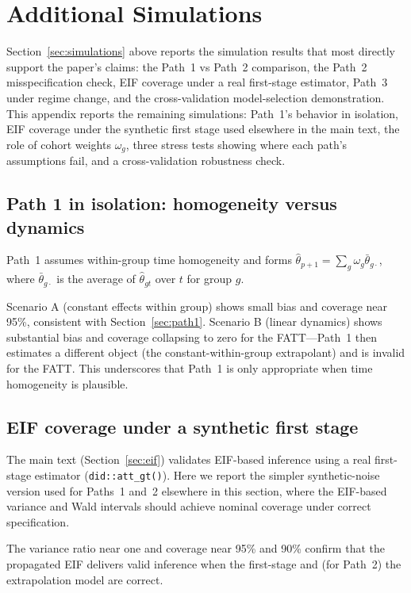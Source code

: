 \documentclass{article}
\begin{document}
\appendix

\section{Additional Simulations}\label{app:additional-sims}

Section~\ref{sec:simulations} above reports the simulation results that most directly support the paper's claims: the Path~1 vs Path~2 comparison, the Path~2 misspecification check, EIF coverage under a real first-stage estimator, Path~3 under regime change, and the cross-validation model-selection demonstration. This appendix reports the remaining simulations: Path~1's behavior in isolation, EIF coverage under the synthetic first stage used elsewhere in the main text, the role of cohort weights $\omega_g$, three stress tests showing where each path's assumptions fail, and a cross-validation robustness check.

\subsection{Path 1 in isolation: homogeneity versus dynamics}

Path~1 assumes within-group time homogeneity and forms $\widehat{\theta}_{p+1} = \sum_g \omega_g \bar{\theta}_{g\cdot}$, where $\bar{\theta}_{g\cdot}$ is the average of $\widehat{\theta}_{gt}$ over $t$ for group $g$.

Scenario A (constant effects within group) shows small bias and coverage near 95\%, consistent with Section~\ref{sec:path1}. Scenario B (linear dynamics) shows substantial bias and coverage collapsing to zero for the FATT---Path~1 then estimates a different object (the constant-within-group extrapolant) and is invalid for the FATT. This underscores that Path~1 is only appropriate when time homogeneity is plausible.

\subsection{EIF coverage under a synthetic first stage}

The main text (Section~\ref{sec:eif}) validates EIF-based inference using a real first-stage estimator (\texttt{did::att\_gt()}). Here we report the simpler synthetic-noise version used for Paths~1 and~2 elsewhere in this section, where the EIF-based variance and Wald intervals should achieve nominal coverage under correct specification.

The variance ratio near one and coverage near 95\% and 90\% confirm that the propagated EIF delivers valid inference when the first-stage and (for Path~2) the extrapolation model are correct.
\end{document}
